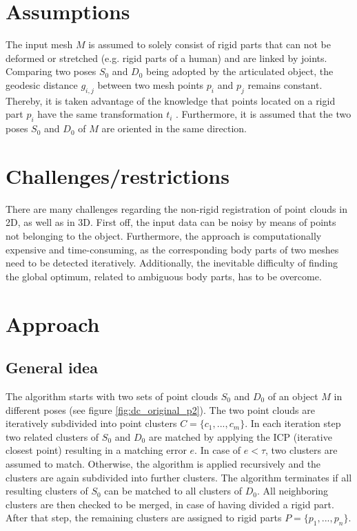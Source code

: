 \documentclass[a4paper,english,11pt]{report}
\begin{document}
\section{Assumptions}

The input mesh $M$ is assumed to solely consist of rigid parts that can not be deformed or stretched (e.g. rigid parts of a human) and are linked by joints. Comparing two poses $S_0$ and $D_0$ being adopted by the articulated object, the geodesic distance $g_{i,j}$ between two mesh points $p_i$ and $p_j$ remains constant. Thereby, it is taken advantage of the knowledge that points located on a rigid part $p_i$ have the same transformation $t_i$ . Furthermore, it is assumed that the two poses $S_0$ and $D_0$ of $M$ are oriented in the same direction.

\section{Challenges/restrictions}

There are many challenges regarding the non-rigid registration of point clouds in 2D, as well as in 3D. First off, the input data can be noisy by means of points not belonging to the object. Furthermore, the approach is computationally expensive and time-consuming, as the corresponding body parts of two meshes need to be detected iteratively. Additionally, the inevitable difficulty of finding the global optimum, related to ambiguous body parts, has to be overcome.

\section{Approach}
\label{divideAndConquer}

\subsection{General idea}

The algorithm starts with two sets of point clouds $S_0$ and $D_0$ of an object $M$ in different poses (see figure \ref{fig:dc_original_p2}). The two point clouds are iteratively subdivided into point clusters $ C =  \{ {c_1, ... , c_m}\}$. In each iteration step two related clusters of $S_0$ and $D_0$ are matched by applying the ICP (iterative closest point) resulting in a matching error $e$. In case of $ e < \tau $, two clusters are assumed to match. Otherwise, the algorithm is applied recursively and the clusters are again subdivided into further clusters. The algorithm terminates if all resulting clusters of $S_0$ can be matched to all clusters of $D_0$. All neighboring clusters are then checked to be merged, in case of having divided a rigid part. After that step, the remaining clusters are assigned to rigid parts $ P =  \{ {p_1, ..., p_n}\}$.
\end{document}
